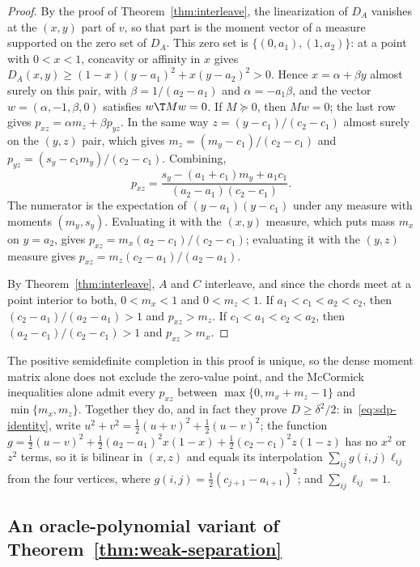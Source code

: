 \begin{proof}
By the proof of Theorem~\ref{thm:interleave}, the linearization of $D_A$
vanishes at the $(x,y)$ part of $v$, so that part is the moment vector of
a measure supported on the zero set of $D_A$. This zero set is
$\{(0,a_1),(1,a_2)\}$: at a point with $0<x<1$, concavity or affinity in
$x$ gives $D_A(x,y)\ge(1-x)(y-a_1)^2+x(y-a_2)^2>0$. Hence $x=\alpha+\beta y$
almost surely on this pair, with $\beta=1/(a_2-a_1)$ and
$\alpha=-a_1\beta$, and the vector $w=(\alpha,-1,\beta,0)$ satisfies
$w\T Mw=0$. If $M\succeq0$, then $Mw=0$; the last row gives
$p_{xz}=\alpha m_z+\beta p_{yz}$. In the same way $z=(y-c_1)/(c_2-c_1)$
almost surely on the $(y,z)$ pair, which gives
$m_z=(m_y-c_1)/(c_2-c_1)$ and $p_{yz}=(s_y-c_1m_y)/(c_2-c_1)$. Combining,
\[
p_{xz}=\frac{s_y-(a_1+c_1)m_y+a_1c_1}{(a_2-a_1)(c_2-c_1)}.
\]
The numerator is the expectation of $(y-a_1)(y-c_1)$ under any measure
with moments $(m_y,s_y)$. Evaluating it with the $(x,y)$ measure, which
puts mass $m_x$ on $y=a_2$, gives $p_{xz}=m_x(a_2-c_1)/(c_2-c_1)$;
evaluating it with the $(y,z)$ measure gives
$p_{xz}=m_z(c_2-a_1)/(a_2-a_1)$.

By Theorem~\ref{thm:interleave}, $A$ and $C$ interleave, and since the
chords meet at a point interior to both, $0<m_x<1$ and $0<m_z<1$. If
$a_1<c_1<a_2<c_2$, then $(c_2-a_1)/(a_2-a_1)>1$ and $p_{xz}>m_z$. If
$c_1<a_1<c_2<a_2$, then $(a_2-c_1)/(c_2-c_1)>1$ and $p_{xz}>m_x$.
\end{proof}

The positive semidefinite completion in this proof is unique, so the
dense moment matrix alone does not exclude the zero-value point, and the
McCormick inequalities alone admit every $p_{xz}$ between
$\max\{0,m_x+m_z-1\}$ and $\min\{m_x,m_z\}$. Together they do, and in fact
they prove $D\ge\delta^2/2$: in~\eqref{eq:sdp-identity}, write
$u^2+v^2=\tfrac12(u+v)^2+\tfrac12(u-v)^2$; the function
$g=\tfrac12(u-v)^2+\tfrac12(a_2-a_1)^2x(1-x)+\tfrac12(c_2-c_1)^2z(1-z)$ has no
$x^2$ or $z^2$ terms, so it is bilinear in $(x,z)$ and equals its
interpolation $\sum_{ij}g(i,j)\ell_{ij}$ from the four vertices, where
$g(i,j)=\tfrac12(c_{j+1}-a_{i+1})^2$; and $\sum_{ij}\ell_{ij}=1$.



\subsection{An oracle-polynomial variant of Theorem~\ref{thm:weak-separation}}\label{app:ellipsoid}

